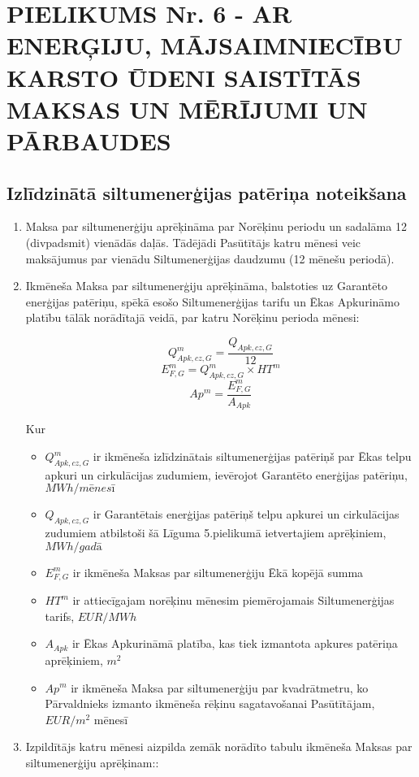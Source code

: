 \section{PIELIKUMS Nr. 6 {-} AR ENERĢIJU, MĀJSAIMNIECĪBU KARSTO ŪDENI SAISTĪTĀS MAKSAS UN MĒRĪJUMI UN PĀRBAUDES}

\subsection{Izlīdzinātā siltumenerģijas patēriņa noteikšana}
\begin{enumerate}
	\item Maksa par siltumenerģiju aprēķināma par Norēķinu periodu un sadalāma 12 (divpadsmit) vienādās daļās. Tādējādi Pasūtītājs katru mēnesi veic maksājumus par vienādu Siltumenerģijas daudzumu (12 mēnešu periodā).
	\item Ikmēneša Maksa par siltumenerģiju aprēķināma, balstoties uz Garantēto enerģijas patēriņu, spēkā esošo Siltumenerģijas tarifu un Ēkas Apkurināmo platību tālāk norādītajā veidā, par katru Norēķinu perioda mēnesi:

\[ Q^{m}_{Apk,cz,G} = \frac{Q_{Apk,cz,G}}{12} \]
\[ E^{m}_{F,G} = Q^{m}_{Apk,cz,G} \times HT^m \]
\[ Ap^m = \frac{E^{m}_{F,G} }{A_{Apk}} \]

Kur

\begin{itemize}
	\item $Q^{m}_{Apk,cz,G}$ ir ikmēneša izlīdzinātais siltumenerģijas patēriņš par Ēkas telpu apkuri un cirkulācijas zudumiem, ievērojot Garantēto enerģijas patēriņu, $MWh/mēnesī$
	\item $Q_{Apk,cz,G}$ ir Garantētais enerģijas patēriņš telpu apkurei un cirkulācijas zudumiem atbilstoši šā Līguma 5.\@ pielikumā ietvertajiem aprēķiniem, $MWh/gadā$
	\item $E^{m}_{F,G}$ ir ikmēneša Maksas par siltumenerģiju Ēkā kopējā summa
	\item $HT^m$ ir attiecīgajam norēķinu mēnesim piemērojamais Siltumenerģijas tarifs, $EUR/MWh$
	\item $A_{Apk}$ ir Ēkas Apkurināmā platība, kas tiek izmantota apkures patēriņa aprēķiniem, $m^2$
	\item $Ap^m$ ir ikmēneša Maksa par siltumenerģiju par kvadrātmetru, ko Pārvaldnieks izmanto ikmēneša rēķinu sagatavošanai Pasūtītājam, $EUR/m^2$ mēnesī
\end{itemize}

\item Izpildītājs katru mēnesi aizpilda zemāk norādīto tabulu ikmēneša Maksas par siltumenerģiju aprēķinam::


\end{enumerate}
